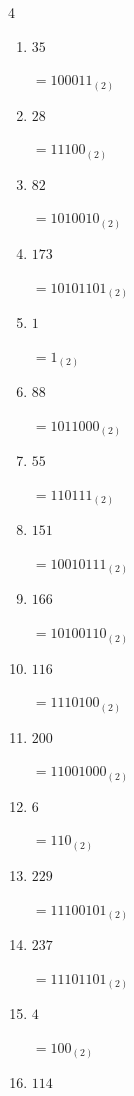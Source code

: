 \begin{multicols}{4}
\begin{enumerate}
        $=11100_{(2)}$

  \item $35$

        $=100011_{(2)}$

  \item $28$

        $=11100_{(2)}$

  \item $82$

        $=1010010_{(2)}$

  \item $173$

        $=10101101_{(2)}$

  \item $1$

        $=1_{(2)}$

  \item $88$

        $=1011000_{(2)}$

  \item $55$

        $=110111_{(2)}$

  \item $151$

        $=10010111_{(2)}$

\columnbreak %

  \item $166$

        $=10100110_{(2)}$

  \item $116$

        $=1110100_{(2)}$

  \item $200$

        $=11001000_{(2)}$

  \item $6$

        $=110_{(2)}$

  \item $229$

        $=11100101_{(2)}$

  \item $237$

        $=11101101_{(2)}$

  \item $4$

        $=100_{(2)}$

  \item $114$


\end{enumerate}
\end{multicols}
